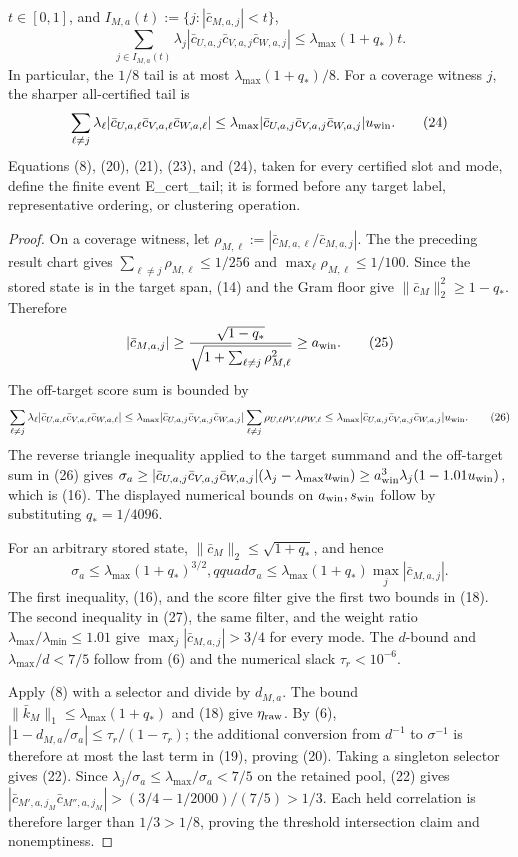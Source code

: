 \begin{proposition}
$t\in[0,1]$, and $I_{M,a}(t):=\{j:|\bar c_{M,a,j}|<t\}$,
\[
\sum_{j\in I_{M,a}(t)}\lambda_j
|\bar c_{U,a,j}\bar c_{V,a,j}\bar c_{W,a,j}|
\le\lambda_{\max}(1+q_*)t.
\tag{23}
\]
In particular, the $1/8$ tail is at most
$\lambda_{\max}(1+q_*)/8$.  For a coverage witness $j$, the sharper
all-certified tail is
\[
\sum_{\ell\ne j}\lambda_\ell
|\bar c_{U,a,\ell}\bar c_{V,a,\ell}\bar c_{W,a,\ell}|
\le\lambda_{\max}|\bar c_{U,a,j}\bar c_{V,a,j}\bar c_{W,a,j}|u_{\rm win}.
\tag{24}
\]
Equations (8), (20), (21), (23), and (24), taken for every certified slot
and mode, define the finite event E\_cert\_tail; it is formed before any
target label, representative ordering, or clustering operation.

\begin{proof}
On a coverage witness, let
$\rho_{M,\ell}:=|\bar c_{M,a,\ell}/\bar c_{M,a,j}|$.  The the preceding result
chart gives $\sum_{\ell\ne j}\rho_{M,\ell}\le1/256$ and
$\max_\ell\rho_{M,\ell}\le1/100$.  Since the stored state is in the
target span, (14) and the Gram floor give
$\|\bar c_M\|_2^2\ge1-q_*$.  Therefore
\[
|\bar c_{M,a,j}|
\ge\frac{\sqrt{1-q_*}}
{\sqrt{1+\sum_{\ell\ne j}\rho_{M,\ell}^2}}
\ge a_{\rm win}.
\tag{25}
\]
The off-target score sum is bounded by
\[
\sum_{\ell\ne j}\lambda_\ell
|\bar c_{U,a,\ell}\bar c_{V,a,\ell}\bar c_{W,a,\ell}|
\le\lambda_{\max}|\bar c_{U,a,j}\bar c_{V,a,j}\bar c_{W,a,j}|
\sum_{\ell\ne j}\rho_{U,\ell}\rho_{V,\ell}\rho_{W,\ell}
\le\lambda_{\max}|\bar c_{U,a,j}\bar c_{V,a,j}\bar c_{W,a,j}|u_{\rm win}.
\tag{26}
\]
The reverse triangle inequality applied to the target summand and the
off-target sum in (26) gives
$\sigma_a\ge |\bar c_{U,a,j}\bar c_{V,a,j}\bar c_{W,a,j}|
(\lambda_j-\lambda_{\max}u_{\rm win})
\ge a_{\rm win}^3\lambda_j(1-1.01u_{\rm win})$,
which is (16). The displayed numerical bounds on $a_{\rm win},s_{\rm win}$
follow by substituting $q_*=1/4096$.

For an arbitrary stored state, $\|\bar c_M\|_2\le\sqrt{1+q_*}$, and hence
\[
\sigma_a\le\lambda_{\max}(1+q_*)^{3/2},qquad
\sigma_a\le\lambda_{\max}(1+q_*)\max_j|\bar c_{M,a,j}|.
\tag{27}
\]
The first inequality, (16), and the score filter give the first two bounds in
(18).  The second inequality in (27), the same filter, and
the weight ratio $\lambda_{\max}/\lambda_{\min}\le1.01$ give
$\max_j|\bar c_{M,a,j}|>3/4$ for every mode. The $d$-bound and
$\lambda_{\max}/d<7/5$ follow from (6) and the numerical slack
$\tau_r<10^{-6}$.

Apply (8) with a selector and divide by $d_{M,a}$. The bound
$\|\bar k_M\|_1\le\lambda_{\max}(1+q_*)$ and (18) give
$\eta_{\rm raw}$. By (6),
$|1-d_{M,a}/\sigma_a|\le\tau_r/(1-\tau_r)$; the additional conversion
from $d^{-1}$ to $\sigma^{-1}$ is therefore at most the last term in (19),
proving (20). Taking a singleton selector gives (22). Since
$\lambda_j/\sigma_a\le\lambda_{\max}/\sigma_a<7/5$ on the retained pool,
(22) gives
$|\bar c_{M',a,j_M}\bar c_{M'',a,j_M}|>(3/4-1/2000)/(7/5)>1/3$.
Each held correlation is therefore larger than $1/3>1/8$, proving the
threshold intersection claim and nonemptiness.


\end{proof}
\end{proposition}
